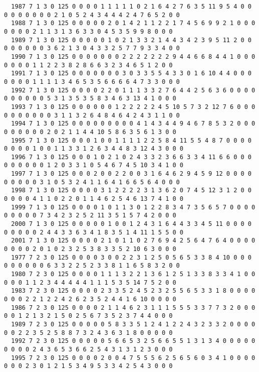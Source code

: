 \begin{landscape}
{\begin{verbatim}
  1987 7 1 3 0 125 0 0 0 0 1 1 1 1 1 0 2 1 6 4 2 7 6 3 5 11 9 5 4 0 0 0 0 0 0 0 0 0 2 1 0 5 2 4 3 4 4 4 2 4 7 6 5 2 0 0
  1988 7 1 3 0 125 0 0 0 0 0 2 0 1 4 2 1 1 2 2 1 7 4 5 6 9 9 2 1 0 0 0 0 0 0 0 2 1 1 3 1 3 6 3 3 0 4 5 3 5 9 9 8 0 0 0
  1989 7 1 3 0 125 0 0 0 0 0 1 0 2 1 3 3 2 1 4 4 3 4 2 3 9 5 11 2 0 0 0 0 0 0 0 0 3 6 2 1 3 0 4 3 3 2 5 7 7 9 3 3 4 0 0
  1990 7 1 3 0 125 0 0 0 0 0 0 0 2 2 2 2 2 2 2 9 4 4 6 6 8 4 4 1 0 0 0 0 0 0 0 1 1 2 2 3 8 2 8 6 6 3 2 3 4 6 5 1 2 0 0
  1991 7 1 3 0 125 0 0 0 0 0 0 0 3 0 3 3 5 5 4 3 3 0 1 6 10 4 4 0 0 0 0 0 0 0 1 1 1 1 3 4 6 5 3 5 6 6 6 6 4 7 3 3 0 0 0
  1992 7 1 3 0 125 0 0 0 0 2 2 0 1 1 1 3 3 2 7 6 4 4 2 5 6 3 6 0 0 0 0 0 0 0 0 0 0 5 3 1 3 5 3 5 8 3 4 6 3 13 4 1 0 0 0
  1993 7 1 3 0 125 0 0 0 0 0 0 1 2 2 2 2 2 4 5 10 5 7 3 2 12 7 6 0 0 0 0 0 0 0 0 0 0 3 1 1 3 2 6 4 8 4 6 4 2 4 3 1 1 0 0
  1994 7 1 3 0 125 0 0 0 0 0 0 0 0 0 4 1 4 3 4 4 9 4 6 7 8 5 3 2 0 0 0 0 0 0 0 0 0 2 0 2 1 1 4 4 10 5 8 6 3 5 6 1 3 0 0
  1995 7 1 3 0 125 0 0 0 1 0 0 1 1 1 1 2 2 5 8 4 11 5 5 4 8 7 0 0 0 0 0 0 0 0 1 0 0 1 1 3 3 1 2 6 3 4 4 8 3 12 4 3 0 0 0
  1996 7 1 3 0 125 0 0 0 1 0 2 1 0 2 4 3 3 2 3 6 6 3 3 4 11 6 6 0 0 0 0 0 0 0 0 0 1 2 0 3 3 1 0 5 4 6 7 4 5 10 3 4 1 0 0
  1997 7 1 3 0 125 0 0 0 2 0 0 2 2 0 0 3 1 6 4 6 2 9 4 5 9 12 0 0 0 0 0 0 0 0 0 3 1 0 5 3 2 4 1 1 6 4 1 6 6 5 6 4 0 0 0
  1998 7 1 3 0 125 0 0 0 0 3 1 2 2 2 2 3 1 3 6 2 0 7 4 5 12 3 1 2 0 0 0 0 0 0 4 1 1 0 2 2 0 1 1 4 6 2 5 4 6 13 7 4 1 0 0
  1999 7 1 3 0 125 0 0 0 0 1 0 1 1 3 0 1 2 2 8 3 4 7 3 5 6 5 7 0 0 0 0 0 0 0 0 0 7 3 4 2 3 2 5 2 11 3 5 1 5 7 4 2 0 0 0
  2000 7 1 3 0 125 0 0 0 0 0 1 0 0 1 2 4 3 1 6 4 4 3 3 4 5 11 0 0 0 0 0 0 0 0 0 2 4 4 3 3 6 3 4 1 8 3 5 1 4 11 1 5 5 0 0
  2001 7 1 3 0 125 0 0 0 0 2 1 0 1 1 0 2 7 6 9 4 2 5 6 4 7 6 4 0 0 0 0 0 0 0 0 2 0 1 0 2 3 2 5 3 8 3 3 5 2 10 6 3 0 0 0
  1977 7 2 3 0 125 0 0 0 0 3 0 0 2 2 3 1 2 5 0 5 6 5 3 3 8 4 10 0 0 0 0 0 0 0 0 0 6 3 3 2 2 5 2 3 3 8 1 1 6 5 8 3 2 0 0
  1980 7 2 3 0 125 0 0 0 0 1 1 1 3 2 2 1 3 6 1 2 5 1 3 3 8 3 3 4 1 0 0 0 0 0 1 1 2 3 4 4 4 4 4 1 1 1 5 3 5 14 7 5 2 0 0
  1983 7 2 3 0 125 0 0 0 0 2 3 3 5 2 4 5 2 3 2 5 5 6 5 3 3 1 8 0 0 0 0 0 0 0 2 2 1 2 2 4 2 6 2 3 5 2 4 4 1 6 10 0 0 0 0
  1986 7 2 3 0 125 0 0 0 0 2 1 1 4 6 2 3 1 1 1 5 5 5 3 3 7 7 3 2 0 0 0 0 0 1 2 1 3 2 1 5 0 2 5 6 7 3 5 2 3 7 4 4 0 0 0
  1989 7 2 3 0 125 0 0 0 0 0 5 8 3 3 5 1 2 4 1 2 2 4 3 2 3 3 2 0 0 0 0 0 0 2 2 3 5 2 5 8 8 7 3 2 4 3 6 3 1 8 0 0 0 0 0
  1992 7 2 3 0 125 0 0 0 0 0 5 6 6 5 3 2 5 6 6 5 5 1 3 1 3 4 0 0 0 0 0 0 0 0 0 2 4 3 6 5 3 6 6 2 5 4 3 1 3 1 2 3 0 0 0
  1995 7 2 3 0 125 0 0 0 0 2 0 0 4 7 5 5 5 6 2 5 6 5 6 0 3 4 1 0 0 0 0 0 0 0 2 3 0 1 2 1 5 3 4 9 5 3 3 4 2 5 4 3 0 0 0

\end{verbatim}}
\end{landscape}
